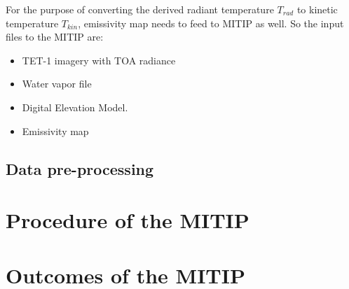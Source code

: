 \noindent For the purpose of converting the derived radiant temperature $T_{rad}$ to kinetic temperature $T_{kin}$, emissivity map needs to feed to MITIP as well. So the input files to the MITIP are:
\begin{itemize}
\item TET-1 imagery with TOA radiance
\item Water vapor file
\item Digital Elevation Model.
\item Emissivity map
\end{itemize}


\subsection{Data pre-processing}


\section{Procedure of the MITIP}



\section{Outcomes of the MITIP}